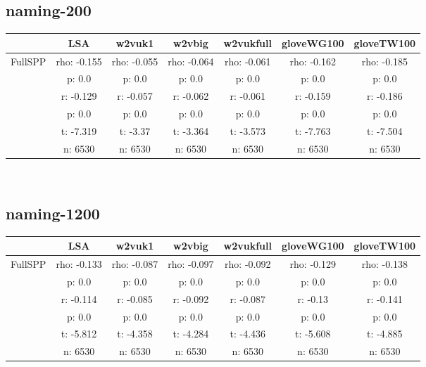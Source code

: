 \documentclass{article}
\begin{document}
\subsection{naming-200}
\begin{tabular}{ccccccc|}\cline{2-7}
&\multicolumn{1}{|c}{LSA} & w2vuk1 & w2vbig & w2vukfull & gloveWG100 & gloveTW100 \\\hline
\multicolumn{1}{|c|}{\multirow{6}{*}{FullSPP}} & rho: -0.155 & rho: -0.055 & rho: -0.064 & rho: -0.061 & rho: -0.162 & rho: -0.185 \\
\multicolumn{1}{|c|}{} & p: 0.0 & p: 0.0 & p: 0.0 & p: 0.0 & p: 0.0 & p: 0.0 \\
\multicolumn{1}{|c|}{} & r: -0.129 & r: -0.057 & r: -0.062 & r: -0.061 & r: -0.159 & r: -0.186 \\
\multicolumn{1}{|c|}{} & p: 0.0 & p: 0.0 & p: 0.0 & p: 0.0 & p: 0.0 & p: 0.0 \\
\multicolumn{1}{|c|}{} & t: -7.319 & t: -3.37 & t: -3.364 & t: -3.573 & t: -7.763 & t: -7.504 \\
\multicolumn{1}{|c|}{} & n: 6530 & n: 6530 & n: 6530 & n: 6530 & n: 6530 & n: 6530 \\
\hline
\end{tabular}\\
\subsection{naming-1200}
\begin{tabular}{ccccccc|}\cline{2-7}
&\multicolumn{1}{|c}{LSA} & w2vuk1 & w2vbig & w2vukfull & gloveWG100 & gloveTW100 \\\hline
\multicolumn{1}{|c|}{\multirow{6}{*}{FullSPP}} & rho: -0.133 & rho: -0.087 & rho: -0.097 & rho: -0.092 & rho: -0.129 & rho: -0.138 \\
\multicolumn{1}{|c|}{} & p: 0.0 & p: 0.0 & p: 0.0 & p: 0.0 & p: 0.0 & p: 0.0 \\
\multicolumn{1}{|c|}{} & r: -0.114 & r: -0.085 & r: -0.092 & r: -0.087 & r: -0.13 & r: -0.141 \\
\multicolumn{1}{|c|}{} & p: 0.0 & p: 0.0 & p: 0.0 & p: 0.0 & p: 0.0 & p: 0.0 \\
\multicolumn{1}{|c|}{} & t: -5.812 & t: -4.358 & t: -4.284 & t: -4.436 & t: -5.608 & t: -4.885 \\
\multicolumn{1}{|c|}{} & n: 6530 & n: 6530 & n: 6530 & n: 6530 & n: 6530 & n: 6530 \\
\hline
\end{tabular}\\
\end{document}
